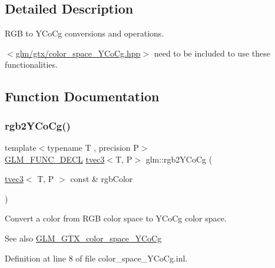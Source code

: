 \subsection{Detailed Description}
R\+GB to Y\+Co\+Cg conversions and operations. 

$<$\mbox{\hyperlink{color__space___y_co_cg_8hpp}{glm/gtx/color\+\_\+space\+\_\+\+Y\+Co\+Cg.\+hpp}}$>$ need to be included to use these functionalities. 

\subsection{Function Documentation}
\mbox{\label{group__gtx__color__space___y_co_cg_ga19481f6947c5b5482debd41e71b8c941}} 
\subsubsection{\texorpdfstring{rgb2YCoCg()}{rgb2YCoCg()}}
{\footnotesize\ttfamily template$<$typename T , precision P$>$ \\
\mbox{\hyperlink{setup_8hpp_ab2d052de21a70539923e9bcbf6e83a51}{G\+L\+M\+\_\+\+F\+U\+N\+C\+\_\+\+D\+E\+CL}} \mbox{\hyperlink{structglm_1_1tvec3}{tvec3}}$<$T, P$>$ glm\+::rgb2\+Y\+Co\+Cg (\begin{DoxyParamCaption}\item[{\mbox{\hyperlink{structglm_1_1tvec3}{tvec3}}$<$ T, P $>$ const \&}]{rgb\+Color }\end{DoxyParamCaption})}

Convert a color from R\+GB color space to Y\+Co\+Cg color space. \begin{DoxySeeAlso}{See also}
\mbox{\hyperlink{group__gtx__color__space___y_co_cg}{G\+L\+M\+\_\+\+G\+T\+X\+\_\+color\+\_\+space\+\_\+\+Y\+Co\+Cg}} 
\end{DoxySeeAlso}


Definition at line 8 of file color\+\_\+space\+\_\+\+Y\+Co\+Cg.\+inl.

\mbox{\label{group__gtx__color__space___y_co_cg_ga2e534594cc8ad252d23b14fb363ae9e2}} 
